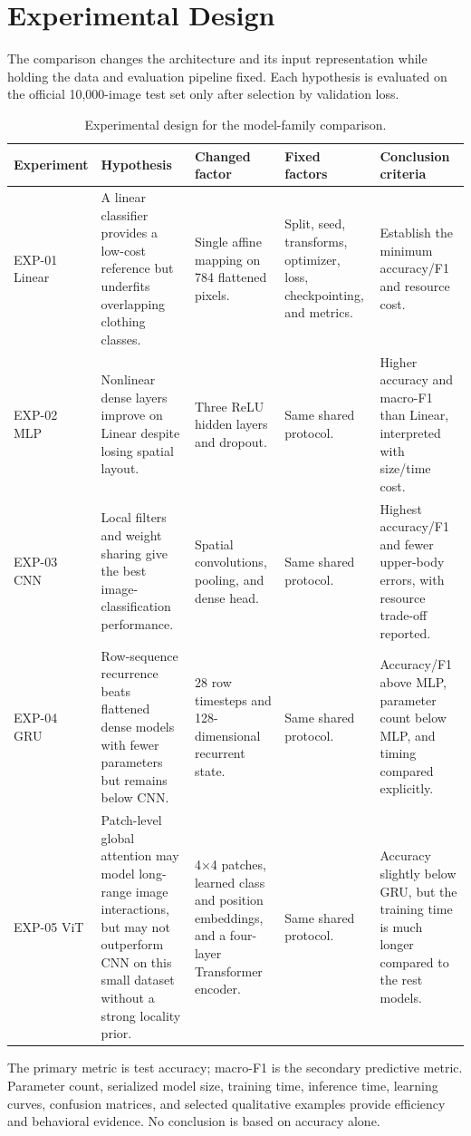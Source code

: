 \section{Experimental Design}

The comparison changes the architecture and its input representation while holding the data and evaluation pipeline fixed. Each hypothesis is evaluated on the official 10,000-image test set only after selection by validation loss.

\begin{table}[H]
    \centering
    \scriptsize
    \caption{Experimental design for the model-family comparison.}
    \label{tab:experimental-design}
    \begin{tabularx}{\textwidth}{@{}lXXXX@{}}
        \toprule
        Experiment & Hypothesis & Changed factor & Fixed factors & Conclusion criteria \\
        \midrule
        EXP-01 Linear & A linear classifier provides a low-cost reference but underfits overlapping clothing classes. & Single affine mapping on 784 flattened pixels. & Split, seed, transforms, optimizer, loss, checkpointing, and metrics. & Establish the minimum accuracy/F1 and resource cost. \\
        EXP-02 MLP & Nonlinear dense layers improve on Linear despite losing spatial layout. & Three ReLU hidden layers and dropout. & Same shared protocol. & Higher accuracy and macro-F1 than Linear, interpreted with size/time cost. \\
        EXP-03 CNN & Local filters and weight sharing give the best image-classification performance. & Spatial convolutions, pooling, and dense head. & Same shared protocol. & Highest accuracy/F1 and fewer upper-body errors, with resource trade-off reported. \\
        EXP-04 GRU & Row-sequence recurrence beats flattened dense models with fewer parameters but remains below CNN. & 28 row timesteps and 128-dimensional recurrent state. & Same shared protocol. & Accuracy/F1 above MLP, parameter count below MLP, and timing compared explicitly. \\
        EXP-05 ViT & Patch-level global attention may model long-range image interactions, but may not outperform CNN on this small dataset without a strong locality prior. & 4×4 patches, learned class and position embeddings, and a four-layer Transformer encoder. & Same shared protocol. & Accuracy slightly below GRU, but the training time is much longer compared to the rest models. \\
        \bottomrule
    \end{tabularx}
\end{table}

The primary metric is test accuracy; macro-F1 is the secondary predictive metric. Parameter count, serialized model size, training time, inference time, learning curves, confusion matrices, and selected qualitative examples provide efficiency and behavioral evidence. No conclusion is based on accuracy alone.
